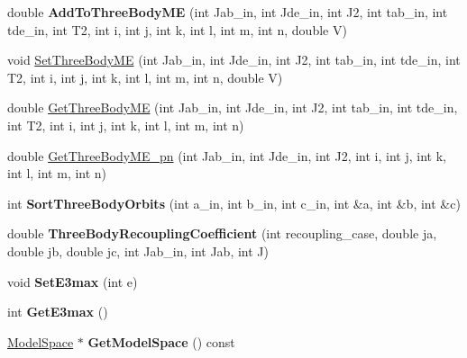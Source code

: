 \begin{DoxyCompactItemize}
\item 
\hypertarget{classOperator_ac56566d6e54d38adebfdec070124d66d}{double {\bfseries Add\-To\-Three\-Body\-M\-E} (int Jab\-\_\-in, int Jde\-\_\-in, int J2, int tab\-\_\-in, int tde\-\_\-in, int T2, int i, int j, int k, int l, int m, int n, double V)}\label{classOperator_ac56566d6e54d38adebfdec070124d66d}

\item 
void \hyperlink{classOperator_a997b0b2df75089a9e910c19410ebd8db}{Set\-Three\-Body\-M\-E} (int Jab\-\_\-in, int Jde\-\_\-in, int J2, int tab\-\_\-in, int tde\-\_\-in, int T2, int i, int j, int k, int l, int m, int n, double V)
\item 
double \hyperlink{classOperator_ab2f0275c25ffb0f04935cb9d6ea043e1}{Get\-Three\-Body\-M\-E} (int Jab\-\_\-in, int Jde\-\_\-in, int J2, int tab\-\_\-in, int tde\-\_\-in, int T2, int i, int j, int k, int l, int m, int n)
\item 
double \hyperlink{classOperator_a260213f7aa6bfb6eb17b11a08c136317}{Get\-Three\-Body\-M\-E\-\_\-pn} (int Jab\-\_\-in, int Jde\-\_\-in, int J2, int i, int j, int k, int l, int m, int n)
\item 
\hypertarget{classOperator_ae41e93056aacccb39e0aa9ad11b050ab}{int {\bfseries Sort\-Three\-Body\-Orbits} (int a\-\_\-in, int b\-\_\-in, int c\-\_\-in, int \&a, int \&b, int \&c)}\label{classOperator_ae41e93056aacccb39e0aa9ad11b050ab}

\item 
\hypertarget{classOperator_a46d120f98270bb0cb4c94b1adcabb0c3}{double {\bfseries Three\-Body\-Recoupling\-Coefficient} (int recoupling\-\_\-case, double ja, double jb, double jc, int Jab\-\_\-in, int Jab, int J)}\label{classOperator_a46d120f98270bb0cb4c94b1adcabb0c3}

\item 
\hypertarget{classOperator_a8b32ed75e5e0d6175a2f2f517c63a89c}{void {\bfseries Set\-E3max} (int e)}\label{classOperator_a8b32ed75e5e0d6175a2f2f517c63a89c}

\item 
\hypertarget{classOperator_a42d67df774701e40e2c49e539a68c937}{int {\bfseries Get\-E3max} ()}\label{classOperator_a42d67df774701e40e2c49e539a68c937}

\item 
\hypertarget{classOperator_a037a75a9f8a0dc970e56240552cc96d2}{\hyperlink{classModelSpace}{Model\-Space} $\ast$ {\bfseries Get\-Model\-Space} () const }\label{classOperator_a037a75a9f8a0dc970e56240552cc96d2}


\end{DoxyCompactItemize}
